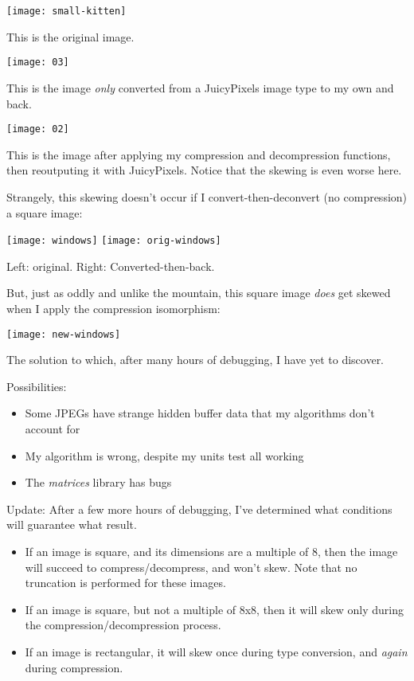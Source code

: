 \documentclass{article}
\begin{document}
\begin{center}
  \texttt{[image: small-kitten]}
\end{center}

This is the original image.

\begin{center}
  \texttt{[image: 03]}
\end{center}

This is the image \emph{only} converted from a JuicyPixels image type
to my own and back.

\begin{center}
  \texttt{[image: 02]}
\end{center}

This is the image after applying my compression and decompression functions,
then reoutputing it with JuicyPixels. Notice that the skewing is even
worse here.

Strangely, this skewing doesn't occur if I convert-then-deconvert
(no compression) a square image:

\begin{center}
  \texttt{[image: windows]}
  \texttt{[image: orig-windows]}
\end{center}

Left: original. Right: Converted-then-back.

But, just as oddly and unlike the mountain, this square image \emph{does}
get skewed when I apply the compression isomorphism:

\begin{center}
  \texttt{[image: new-windows]}
\end{center}

The solution to which, after many hours of debugging, I have yet
to discover.

Possibilities:

\begin{itemize}
\item Some JPEGs have strange hidden buffer data that my algorithms
  don't account for
\item My algorithm is wrong, despite my units test all working
\item The \emph{matrices} library has bugs
\end{itemize}

Update: After a few more hours of debugging, I've determined what conditions
will guarantee what result.

\begin{itemize}
\item If an image is square, and its dimensions are a multiple of 8,
  then the image will succeed to compress/decompress, and won't skew. Note
  that no truncation is performed for these images.
\item If an image is square, but not a multiple of 8x8, then it
  will skew only during the compression/decompression process.
\item If an image is rectangular, it will skew once during type conversion,
  and \emph{again} during compression.
\end{itemize}
\end{document}
